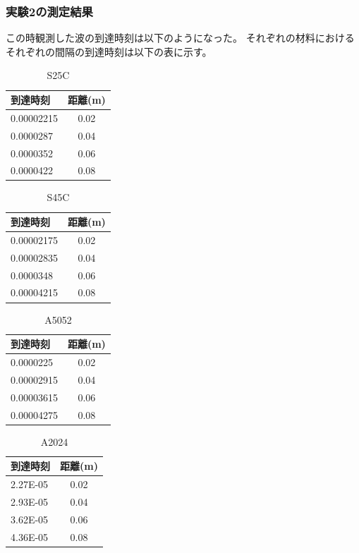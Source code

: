 \documentclass[uplatex,dvipdfmx,titlepage]{jsarticle}
\begin{document}
\subsubsection*{実験2の測定結果}
この時観測した波の到達時刻は以下のようになった。
それぞれの材料におけるそれぞれの間隔の到達時刻は以下の表に示す。

\begin{table}[H]
    \centering
    \caption{S25C}
    \begin{tabular}{lc}
    \hline
    到達時刻 & 距離(m) \\ \hline
    0.00002215 & 0.02  \\
    0.0000287  & 0.04  \\
    0.0000352  & 0.06  \\
    0.0000422  & 0.08  \\ \hline
    \end{tabular}
\end{table}

\begin{table}[H]
    \centering
    \caption{S45C}
    \begin{tabular}{lc}
    \hline
    到達時刻 & 距離(m) \\ \hline
    0.00002175 & 0.02 \\
    0.00002835 & 0.04 \\
    0.0000348  & 0.06 \\
    0.00004215 & 0.08 \\ \hline
    \end{tabular}
\end{table}

\begin{table}[H]
    \centering
    \caption{A5052}
    \begin{tabular}{lc}
    \hline
    到達時刻 & 距離(m) \\ \hline
    0.0000225  & 0.02 \\
    0.00002915 & 0.04 \\
    0.00003615 & 0.06 \\
    0.00004275 & 0.08 \\ \hline
    \end{tabular}
\end{table}

\begin{table}[H]
    \centering
    \caption{A2024}
    \begin{tabular}{lc}
    \hline
    到達時刻 & 距離(m) \\ \hline
    2.27E-05 & 0.02 \\
    2.93E-05 & 0.04 \\
    3.62E-05 & 0.06 \\
    4.36E-05 & 0.08 \\ \hline
    \end{tabular}
\end{table}
\end{document}
